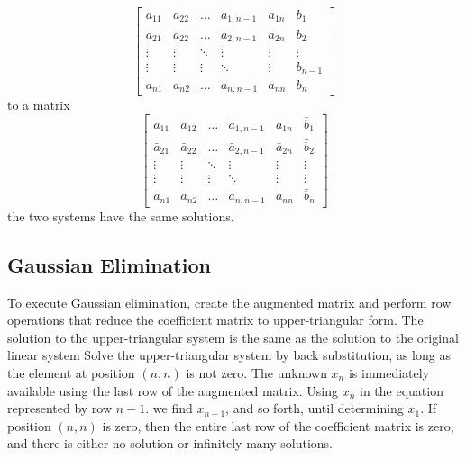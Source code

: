 \documentclass[../main.tex]{subfiles}
\begin{document}
$$
\left[\begin{array}{ccccc|c}
a_{11} & a_{22} & \ldots & a_{1, n-1} & a_{1 n} & b_{1} \\
a_{21} & a_{22} & \ldots & a_{2, n-1} & a_{2 n} & b_{2} \\
\vdots & \vdots & \ddots & \vdots & \vdots & \vdots \\
\vdots & \vdots & \vdots & \ddots & \vdots & b_{n-1} \\
a_{n 1} & a_{n 2} & \ldots & a_{n, n-1} & a_{n n} & b_{n}
\end{array}\right]
$$
to a matrix
$$
\left[\begin{array}{ccccc|c}
\bar{a}_{11} & \bar{a}_{12} & \ldots & \bar{a}_{1, n-1} & \bar{a}_{1 n} & \bar{b}_{1} \\
\bar{a}_{21} & \bar{a}_{22} & \ldots & \bar{a}_{2, n-1} & \bar{a}_{2 n} & \bar{b}_{2} \\
\vdots & \vdots & \ddots & \vdots & \vdots & \vdots \\
\vdots & \vdots & \vdots & \ddots & \vdots & \vdots \\
\bar{a}_{n 1} & \bar{a}_{n 2} & \ldots & \bar{a}_{n, n-1} & \bar{a}_{n n} & \bar{b}_{n}
\end{array}\right]
$$
the two systems have the same solutions.

\subsection*{Gaussian Elimination}
To execute Gaussian elimination, create the augmented matrix and perform row operations that reduce the coefficient matrix to upper-triangular form. The solution to the upper-triangular system is the same as the solution to the original linear system Solve the upper-triangular system by back substitution, as long as the element at position $(n, n)$ is not zero. The unknown $x_{n}$ is immediately available using the last row of the augmented matrix. Using $x_{n}$ in the equation represented by row $n-1$. we find $x_{n-1}$, and so forth, until determining $x_{1}$. If position $(n, n)$ is zero, then the entire last row of the coefficient matrix is zero, and there is either no solution or infinitely many solutions.
\end{document}
